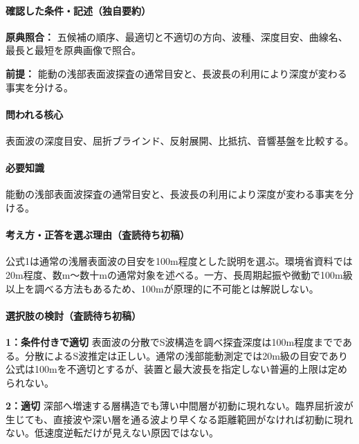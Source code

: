 \paragraph{確認した条件・記述（独自要約）}\mbox{}\par

\noindent\textbf{原典照合：} 五候補の順序、最適切と不適切の方向、波種、深度目安、曲線名、最長と最短を原典画像で照合。\par

\noindent\textbf{前提：} 能動の浅部表面波探査の通常目安と、長波長の利用により深度が変わる事実を分ける。\par

\paragraph{問われる核心} 表面波の深度目安、屈折ブラインド、反射展開、比抵抗、音響基盤を比較する。

\paragraph{必要知識} 能動の浅部表面波探査の通常目安と、長波長の利用により深度が変わる事実を分ける。

\paragraph{考え方・正答を選ぶ理由（査読待ち初稿）} 公式1は通常の浅層表面波の目安を100m程度とした説明を選ぶ。環境省資料では20m程度、数m〜数十mの通常対象を述べる。一方、長周期起振や微動で100m級以上を調べる方法もあるため、100mが原理的に不可能とは解説しない。

\paragraph{選択肢の検討（査読待ち初稿）}\mbox{}\par

\noindent\textbf{1：条件付きで適切} 表面波の分散でS波構造を調べ探査深度は100m程度までである。分散によるS波推定は正しい。通常の浅部能動測定では20m級の目安であり公式は100mを不適切とするが、装置と最大波長を指定しない普遍的上限は定められない。\par

\noindent\textbf{2：適切} 深部へ増速する層構造でも薄い中間層が初動に現れない。臨界屈折波が生じても、直接波や深い層を通る波より早くなる距離範囲がなければ初動に現れない。低速度逆転だけが見えない原因ではない。\par

